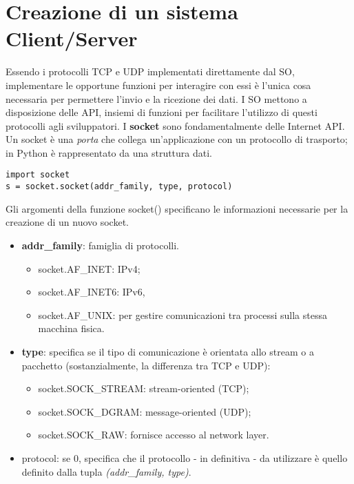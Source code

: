 \section{Creazione di un sistema Client/Server}
Essendo i protocolli TCP e UDP implementati direttamente dal SO, implementare le opportune funzioni per interagire con essi è l'unica cosa necessaria per permettere l'invio e la ricezione dei dati.
I SO mettono a disposizione delle API, insiemi di funzioni per facilitare l'utilizzo di questi protocolli agli sviluppatori.
I \textbf{socket} sono fondamentalmente delle Internet API.
Un socket è una \textit{porta} che collega un'applicazione con un protocollo di trasporto; in Python è rappresentato da una struttura dati.
\begin{lstlisting}
import socket
s = socket.socket(addr_family, type, protocol)
\end{lstlisting}
Gli argomenti della funzione socket() specificano le informazioni necessarie per la creazione di un nuovo socket.
\begin{itemize}
\item \textbf{addr\_family}: famiglia di protocolli.
\begin{itemize}
	 \item socket.AF\_INET: IPv4;
	 \item socket.AF\_INET6: IPv6,
	 \item socket.AF\_UNIX: per gestire comunicazioni tra processi sulla stessa macchina fisica.
\end{itemize}
\item \textbf{type}: specifica se il tipo di comunicazione è orientata allo stream o a pacchetto (sostanzialmente, la differenza tra TCP e UDP):
\begin{itemize}
	\item socket.SOCK\_STREAM: stream-oriented (TCP);
	\item socket.SOCK\_DGRAM: message-oriented (UDP);
	\item socket.SOCK\_RAW: fornisce accesso al network layer.
\end{itemize}
\item protocol: se 0, specifica che il protocollo - in definitiva - da utilizzare è quello definito dalla tupla \textit{(addr\_family, type)}.
\end{itemize}

